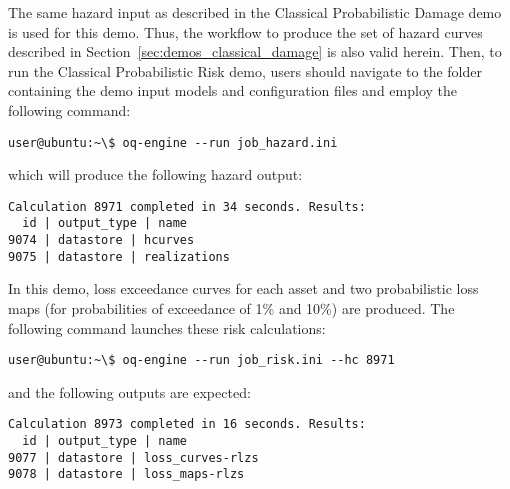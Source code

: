 The same hazard input as described in the Classical Probabilistic Damage demo
is used for this demo. Thus, the workflow to produce the set of hazard curves
described in Section~\ref{sec:demos_classical_damage} is also valid herein.
Then, to run the Classical Probabilistic Risk demo, users should navigate to
the folder containing the demo input models and configuration files and employ
the following command:

\begin{verbatim}
user@ubuntu:~\$ oq-engine --run job_hazard.ini
\end{verbatim}

which will produce the following hazard output:

\begin{verbatim}
Calculation 8971 completed in 34 seconds. Results:
  id | output_type | name
9074 | datastore | hcurves
9075 | datastore | realizations
\end{verbatim}

In this demo, loss exceedance curves for each asset and two probabilistic loss
maps (for probabilities of exceedance of 1\% and 10\%) are produced. The
following command launches these risk calculations:

\begin{verbatim}
user@ubuntu:~\$ oq-engine --run job_risk.ini --hc 8971
\end{verbatim}

and the following outputs are expected:

\begin{verbatim}
Calculation 8973 completed in 16 seconds. Results:
  id | output_type | name
9077 | datastore | loss_curves-rlzs
9078 | datastore | loss_maps-rlzs
\end{verbatim}
